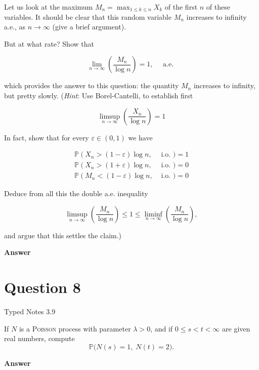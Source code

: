\documentclass[letterpaper]{article}
\begin{document}
		Let us look at the maximum $M_{n}=\max _{1 \leq k \leq n} X_{k}$ of the first $n$ of these variables. It should be clear that this random variable $M_{n}$ increases to infinity a.e., as $n \rightarrow \infty$ (give a brief argument).
		
		But at what rate? Show that
		
		$$
		\lim _{n \rightarrow \infty}\left(\frac{M_{n}}{\log n}\right)=1, \quad \text { a.e. }
		$$
		
		which provides the answer to this question: the quantity $M_{n}$ increases to infinity, but pretty slowly. (\emph{Hint}: Use Borel-Cantelli, to establish first
		
		$$
		\limsup _{n \rightarrow \infty}\left(\frac{X_{n}}{\log n}\right)=1
		$$
		
		In fact, show that for every $\varepsilon \in(0,1)$ we have
		
		$$
		\begin{array}{ll}
			\mathbb{P}\left(X_{n}>(1-\varepsilon) \log n,\right. & \text { i.o. })=1 \\
			\mathbb{P}\left(X_{n}>(1+\varepsilon) \log n,\right. & \text { i.o. })=0 \\
			\mathbb{P}\left(M_{n}<(1-\varepsilon) \log n,\right. & \text { i.o. })=0
		\end{array}
		$$
		
		Deduce from all this the double a.e. inequality
		
		$$
		\limsup _{n \rightarrow \infty}\left(\frac{M_{n}}{\log n}\right) \leq 1 \leq \liminf _{n \rightarrow \infty}\left(\frac{M_{n}}{\log n}\right),
		$$
		
		and argue that this settles the claim.)
		
		\textbf{Answer}
		
		\clearpage
		
		\section{Question 8}
		
		{\color{deepred} Typed Notes 3.9} 
		
		If $N$ is a \textsc{Poisson} process with parameter $\lambda>0$, and if $0\le s<t<\infty$ are given real numbers, compute
		\[
		\mathbb{P}\bigl(N(s)=1,\; N(t)=2\bigr).
		\]
		
	
		
		\textbf{Answer}
		
		\clearpage
		
\end{document}
